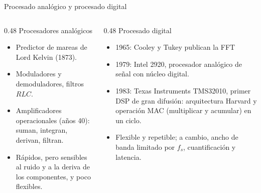 \documentclass[aspectratio=169,11pt]{beamer}
\begin{document}
\begin{frame}{Procesado analógico y procesado digital}
  \begin{columns}[T]
    \begin{column}{0.48\textwidth}
      \alert{Procesadores analógicos}
      \begin{itemize}\small
        \item Predictor de mareas de Lord Kelvin (1873).
        \item Moduladores y demoduladores, filtros $RLC$.
        \item Amplificadores operacionales (años 40): suman, integran, derivan, filtran.
        \item Rápidos, pero sensibles al ruido y a la deriva de los componentes, y poco flexibles.
      \end{itemize}
    \end{column}
    \begin{column}{0.48\textwidth}
      \alert{Procesado digital}
      \begin{itemize}\small
        \item 1965: Cooley y Tukey publican la FFT 
        \item 1979: Intel 2920, procesador analógico de señal con núcleo digital.
        \item 1983: Texas Instruments TMS32010, primer DSP de gran difusión: arquitectura Harvard y operación MAC (multiplicar y acumular) en un ciclo.
        \item Flexible y repetible; a cambio, ancho de banda limitado por $f_s$, cuantificación y latencia.
      \end{itemize}
    \end{column}
  \end{columns}
\end{frame}
\end{document}
